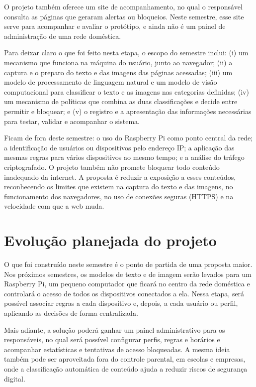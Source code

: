 \documentclass[
    12pt,           %
    oneside,        %
    a4paper,        %
    chapter=TITLE,  %
    english,        %
    brazil          %
]{abntex2}
\begin{document}
O projeto também oferece um site de acompanhamento, no qual o responsável
consulta as páginas que geraram alertas ou bloqueios.
Neste semestre, esse site serve para acompanhar e avaliar o protótipo, e
ainda não é um painel de administração de uma rede doméstica.

Para deixar claro o que foi feito nesta etapa, o escopo do semestre inclui:
(i) um mecanismo que funciona na máquina do usuário, junto ao navegador;
(ii) a captura e o preparo do texto e das imagens das páginas acessadas;
(iii) um modelo de processamento de linguagem natural e um modelo de visão
computacional para classificar o texto e as imagens nas categorias definidas;
(iv) um mecanismo de políticas que combina as duas classificações e decide
entre permitir e bloquear; e (v) o registro e a apresentação das informações
necessárias para testar, validar e acompanhar o sistema.

Ficam de fora deste semestre: o uso do Raspberry Pi como ponto central da
rede; a identificação de usuários ou dispositivos pelo endereço IP; a
aplicação das mesmas regras para vários dispositivos ao mesmo tempo; e a
análise do tráfego criptografado. O projeto também não promete bloquear todo
conteúdo inadequado da internet. A proposta é reduzir a exposição a esses
conteúdos, reconhecendo os limites que existem na captura do texto e das
imagens, no funcionamento dos navegadores, no uso de conexões seguras (HTTPS)
e na velocidade com que a web muda.

\section*{Evolução planejada do projeto}

O que foi construído neste semestre é o ponto de partida de uma proposta
maior. Nos próximos semestres, os modelos de texto e de imagem serão levados
para um Raspberry Pi, um pequeno computador que ficará no centro da rede
doméstica e controlará o acesso de todos os dispositivos conectados a ela.
Nessa etapa, será possível associar regras a cada dispositivo e, depois, a
cada usuário ou perfil, aplicando as decisões de forma centralizada.

Mais adiante, a solução poderá ganhar um painel administrativo para os
responsáveis, no qual será possível configurar perfis, regras e horários e
acompanhar estatísticas e tentativas de acesso bloqueadas. A mesma ideia
também pode ser aproveitada fora do controle parental, em escolas e empresas,
onde a classificação automática de conteúdo ajuda a reduzir riscos de
segurança digital.
\end{document}
